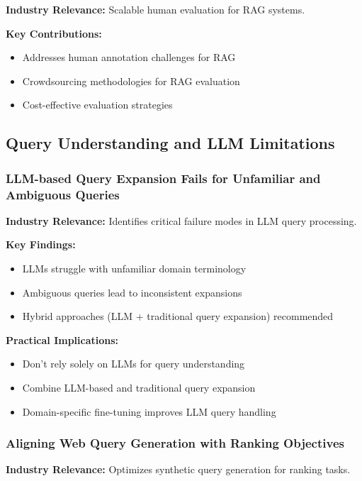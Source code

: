 \documentclass[11pt,letterpaper]{article}
\begin{document}
\textbf{Industry Relevance:} Scalable human evaluation for RAG systems.

\textbf{Key Contributions:}
\begin{itemize}[leftmargin=*]
    \item Addresses human annotation challenges for RAG
    \item Crowdsourcing methodologies for RAG evaluation
    \item Cost-effective evaluation strategies
\end{itemize}

\subsection{Query Understanding and LLM Limitations}

\subsubsection{LLM-based Query Expansion Fails for Unfamiliar and Ambiguous Queries}

\textbf{Industry Relevance:} Identifies critical failure modes in LLM query processing.

\textbf{Key Findings:}
\begin{itemize}[leftmargin=*]
    \item LLMs struggle with unfamiliar domain terminology
    \item Ambiguous queries lead to inconsistent expansions
    \item Hybrid approaches (LLM + traditional query expansion) recommended
\end{itemize}

\textbf{Practical Implications:}
\begin{itemize}[leftmargin=*]
    \item Don't rely solely on LLMs for query understanding
    \item Combine LLM-based and traditional query expansion
    \item Domain-specific fine-tuning improves LLM query handling
\end{itemize}

\subsubsection{Aligning Web Query Generation with Ranking Objectives}

\textbf{Industry Relevance:} Optimizes synthetic query generation for ranking tasks.
\end{document}
